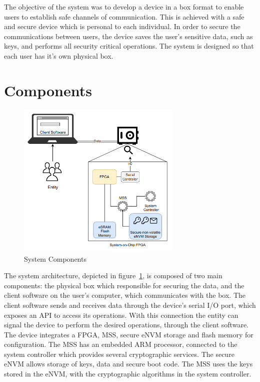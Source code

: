 \cleardoublepage
\label{chap:arch}

The objective of the system was to develop a device in a box format to enable users to establish safe channels of communication. This is achieved with a safe and secure device which is personal to each individual. In order to secure the communications between users, the device saves the user's sensitive data, such as keys, and performs all security critical operations.
The system is designed so that each user has it's own physical box.

\section{Components}\label{chap:arch:components}

\begin{figure}[h]
    \centering
    \includegraphics[width=0.7\textwidth]{./Images/main-components.png}
    \caption{System Components}
    \label{fig:components}
\end{figure}

The system architecture, depicted in figure~\ref{fig:components}, is composed of two main components: the physical box which responsible for securing the data, and the client software on the user's computer, which communicates with the box.
The client software sends and receives data through the device's serial I/O port, which exposes an \ac{API} to access its operations.
With this connection the entity can signal the device to perform the desired operations, through the client software.
The device integrates a \ac{FPGA}, \ac{MSS}, secure eNVM storage and flash memory for configuration. The \ac{MSS} has an embedded ARM processor, connected to the system controller which provides several cryptographic services. The secure eNVM allows storage of keys, data and secure boot code.
The \ac{MSS} uses the keys stored in the eNVM, with the cryptographic algorithms in the system controller.

